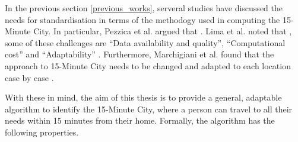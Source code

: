 In the previous section \ref{previous_works}, serveral studies have discussed the needs for standardisation in terms of the methodogy used in computing the 15-Minute City. In particular, Pezzica et al. argued that  \cite{Pezzica_Altafini_Mara_Chioni_2024}. Lima et al. noted that , some of these challenges are “Data availability and quality”, “Computational cost” and “Adaptability” \cite{lima_quest_2023}. Furthermore, Marchigiani et al. found that the approach to 15-Minute City needs to be changed and adapted to each location case by case \cite{marchigiani_urban_2022}.

With these in mind, the aim of this thesis is to provide a general, adaptable algorithm to identify the 15-Minute City, where a person can travel to all their needs within 15 minutes from their home. Formally, the algorithm has the following properties.


